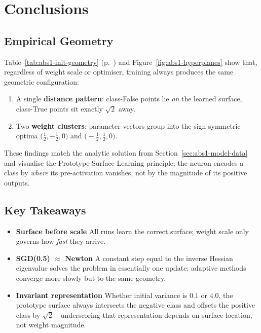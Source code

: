 ﻿%
\section{Conclusions}
\label{sec:abs1-conclusions}

\subsection*{Empirical Geometry}

Table~\ref{tab:abs1-init-geometry} (p.~\pageref{tab:abs1-init-geometry}) and
Figure~\ref{fig:abs1-hyperplanes} show that, regardless of weight scale or
optimiser, training always produces the same geometric configuration:

\begin{enumerate}[label=(\alph*)]
    \item A single \textbf{distance pattern}: class-False points lie \emph{on}
          the learned surface, class-True points sit exactly
          $\sqrt2$ away.
    \item Two \textbf{weight clusters}: parameter vectors group into the
          sign-symmetric optima
          \(\bigl(\tfrac12,-\tfrac12,0\bigr)\) and
          \(\bigl(-\tfrac12,\tfrac12,0\bigr)\).
\end{enumerate}

These findings match the analytic solution from
Section~\ref{sec:abs1-model-data} and visualise the Prototype-Surface Learning
principle: the neuron encodes a class by \emph{where} its pre-activation
vanishes, not by the magnitude of its positive outputs.

\subsection*{Key Takeaways}

\begin{itemize}
    \item \textbf{Surface before scale}  
          All runs learn the correct surface; weight scale only governs how
          \emph{fast} they arrive.
    \item \textbf{SGD(0.5) $\boldsymbol{\approx}$ Newton}  
          A constant step equal to the inverse Hessian eigenvalue solves the
          problem in essentially one update; adaptive methods converge more
          slowly but to the same geometry.
    \item \textbf{Invariant representation}  
          Whether initial variance is $0.1$ or $4.0$, the prototype surface
          always intersects the negative class and offsets the positive class
          by $\sqrt2$—underscoring that representation depends on surface
          location, not weight magnitude.
\end{itemize}

